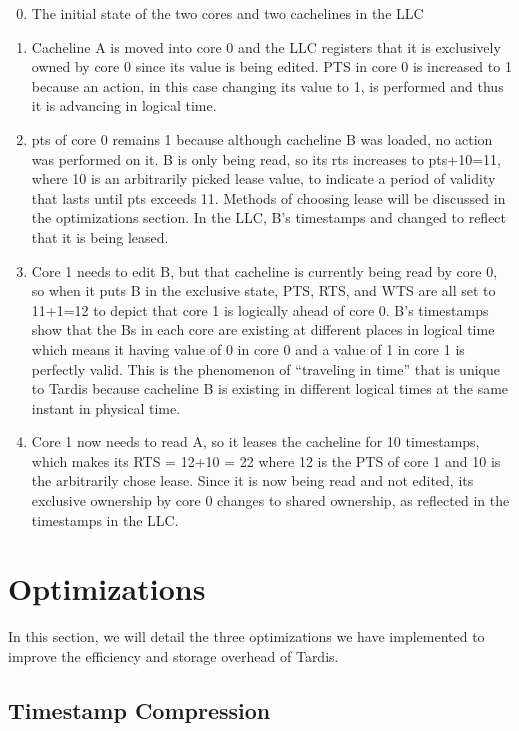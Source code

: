 \documentclass[12pt]{article}
\begin{document}
\begin{enumerate}
\setcounter{enumi}{-1}
	
\item The initial state of the two cores and two cachelines in the LLC
\item Cacheline A is moved into core 0 and the LLC registers that it is exclusively owned by core 0 since its value is being edited. PTS in core 0 is increased to 1 because an action, in this case changing its value to 1, is performed and thus it is advancing in logical time. 
\item pts of core 0 remains 1 because although cacheline B was loaded, no action was performed on it. B is only being read, so its rts increases to pts+10=11, where 10 is an arbitrarily picked lease value, to indicate a period of validity that lasts until pts exceeds 11. Methods of choosing lease will be discussed in the optimizations section. In the LLC, B’s timestamps and changed to reflect that it is being leased.
\item Core 1 needs to edit B, but that cacheline is currently being read by core 0, so when it puts B in the exclusive state, PTS, RTS, and WTS are all set to 11+1=12 to depict that core 1 is logically ahead of core 0. B’s timestamps show that the Bs in each core are existing at different places in logical time which means it having value of 0 in core 0 and a value of 1 in core 1 is perfectly valid. This is the phenomenon of “traveling in time” that is unique to Tardis because cacheline B is existing in different logical times at the same instant in physical time. 
\item Core 1 now needs to read A, so it leases the cacheline for 10 timestamps, which makes its RTS = 12+10 = 22 where 12 is the PTS of core 1 and 10 is the arbitrarily chose lease. Since it is now being read and not edited, its exclusive ownership by core 0 changes to shared ownership, as reflected in the timestamps in the LLC.
\end{enumerate}

\section{Optimizations} \label{sec:optimization}

In this section, we will detail the three optimizations we  have implemented to improve the efficiency and storage overhead of Tardis.

\subsection{Timestamp Compression}
\end{document}
